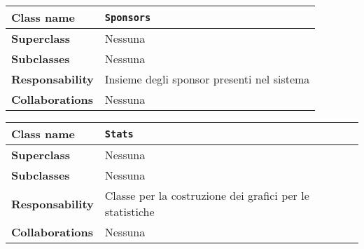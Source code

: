 \begin{table}[h!]
	\begin{tabular}{|l|l|}
		\hline 
		\textbf{Class name} & \texttt{Sponsors}
		\\ \hline
		\textbf{Superclass} & Nessuna
		\\ \hline
		\multirow{1}{*}{\textbf{Subclasses}} & Nessuna
		\\ \hline
		\textbf{Responsability} & Insieme degli sponsor presenti nel sistema
		\\ \hline
		\multirow{1}{*}{\textbf{Collaborations}} & Nessuna
		\\ \hline
	\end{tabular}
\end{table}

\begin{table}[h!]
	\begin{tabular}{|l|l|}
		\hline 
		\textbf{Class name} & \texttt{Stats}
		\\ \hline
		\textbf{Superclass} & Nessuna
		\\ \hline
		\multirow{1}{*}{\textbf{Subclasses}} & Nessuna
		\\ \hline
		\textbf{Responsability} & Classe per la costruzione dei grafici per le statistiche
		\\ \hline
		\multirow{1}{*}{\textbf{Collaborations}} & Nessuna
		\\ \hline
	\end{tabular}
\end{table}
